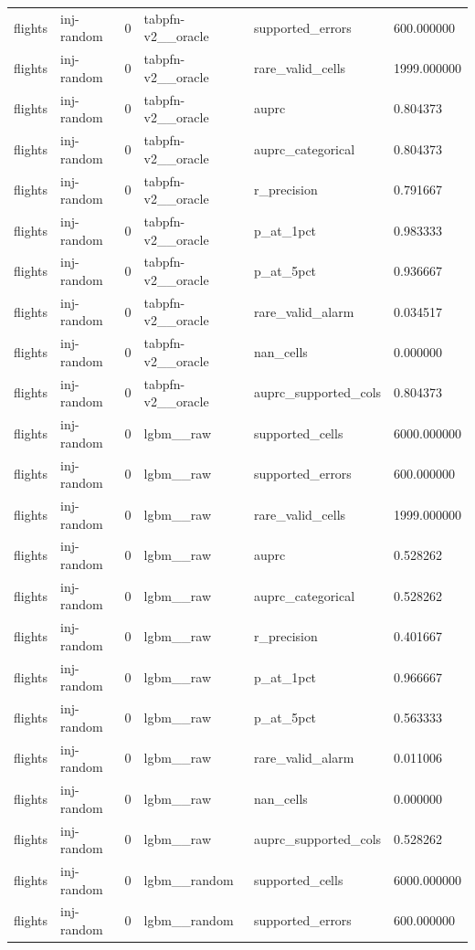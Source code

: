 \begin{tabular}{llllll}
flights & inj-random & 0 & tabpfn-v2\_\_oracle & supported\_errors & 600.000000 \\
flights & inj-random & 0 & tabpfn-v2\_\_oracle & rare\_valid\_cells & 1999.000000 \\
flights & inj-random & 0 & tabpfn-v2\_\_oracle & auprc & 0.804373 \\
flights & inj-random & 0 & tabpfn-v2\_\_oracle & auprc\_categorical & 0.804373 \\
flights & inj-random & 0 & tabpfn-v2\_\_oracle & r\_precision & 0.791667 \\
flights & inj-random & 0 & tabpfn-v2\_\_oracle & p\_at\_1pct & 0.983333 \\
flights & inj-random & 0 & tabpfn-v2\_\_oracle & p\_at\_5pct & 0.936667 \\
flights & inj-random & 0 & tabpfn-v2\_\_oracle & rare\_valid\_alarm & 0.034517 \\
flights & inj-random & 0 & tabpfn-v2\_\_oracle & nan\_cells & 0.000000 \\
flights & inj-random & 0 & tabpfn-v2\_\_oracle & auprc\_supported\_cols & 0.804373 \\
flights & inj-random & 0 & lgbm\_\_raw & supported\_cells & 6000.000000 \\
flights & inj-random & 0 & lgbm\_\_raw & supported\_errors & 600.000000 \\
flights & inj-random & 0 & lgbm\_\_raw & rare\_valid\_cells & 1999.000000 \\
flights & inj-random & 0 & lgbm\_\_raw & auprc & 0.528262 \\
flights & inj-random & 0 & lgbm\_\_raw & auprc\_categorical & 0.528262 \\
flights & inj-random & 0 & lgbm\_\_raw & r\_precision & 0.401667 \\
flights & inj-random & 0 & lgbm\_\_raw & p\_at\_1pct & 0.966667 \\
flights & inj-random & 0 & lgbm\_\_raw & p\_at\_5pct & 0.563333 \\
flights & inj-random & 0 & lgbm\_\_raw & rare\_valid\_alarm & 0.011006 \\
flights & inj-random & 0 & lgbm\_\_raw & nan\_cells & 0.000000 \\
flights & inj-random & 0 & lgbm\_\_raw & auprc\_supported\_cols & 0.528262 \\
flights & inj-random & 0 & lgbm\_\_random & supported\_cells & 6000.000000 \\
flights & inj-random & 0 & lgbm\_\_random & supported\_errors & 600.000000 \\

\end{tabular}
